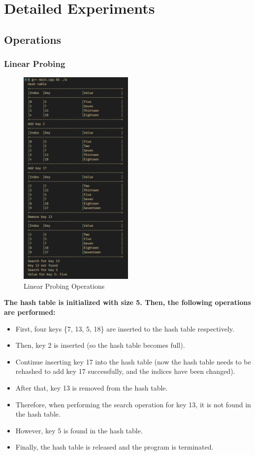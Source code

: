 \section{Detailed Experiments}
\subsection{Operations}
\subsubsection*{Linear Probing}
\begin{figure}[H]
	\centering
	\includegraphics[width=0.5\textwidth, height=0.65\textheight]{images/linear_prob/main.png}
	\caption{Linear Probing Operations}
\end{figure}
\textbf{The hash table is initialized with size 5. Then, the following operations are performed:}
\begin{itemize}
	\item First, four keys \{7, 13, 5, 18\} are inserted to the hash table respectively.
	\item Then, key 2 is inserted (so the hash table becomes full).
	\item Continue inserting key 17 into the hash table (now the hash table needs to be rehashed to add key 17 successfully, and the indices have been changed).
	\item After that, key 13 is removed from the hash table.
	\item Therefore, when performing the search operation for key 13, it is not found in the hash table.
	\item However, key 5 is found in the hash table.
	\item Finally, the hash table is released and the program is terminated.
\end{itemize}


